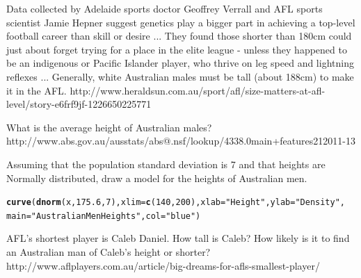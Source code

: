 \documentclass[bigtut]{tutorial}\usepackage[]{graphicx}\usepackage[]{color}
\makeatletter
\newcommand{\hlnum}[1]{\textcolor[rgb]{0.686,0.059,0.569}{#1}}%
\newcommand{\hlstr}[1]{\textcolor[rgb]{0.192,0.494,0.8}{#1}}%
\newcommand{\hlstd}[1]{\textcolor[rgb]{0.345,0.345,0.345}{#1}}%
\newcommand{\hlkwc}[1]{\textcolor[rgb]{0.333,0.667,0.333}{#1}}%
\newcommand{\hlkwd}[1]{\textcolor[rgb]{0.737,0.353,0.396}{\textbf{#1}}}%
\newenvironment{kframe}{%
 \def\at@end@of@kframe{}%
 \ifinner\ifhmode%
  \def\at@end@of@kframe{\end{minipage}}%
  \begin{minipage}{\columnwidth}%
 \fi\fi%
 \def\FrameCommand##1{\hskip\@totalleftmargin \hskip-\fboxsep
 \colorbox{shadecolor}{##1}\hskip-\fboxsep
     \hskip-\linewidth \hskip-\@totalleftmargin \hskip\columnwidth}%
 \MakeFramed {\advance\hsize-\width
   \@totalleftmargin\z@ \linewidth\hsize
   \@setminipage}}%
 {\par\unskip\endMakeFramed%
 \at@end@of@kframe}
\newenvironment{knitrout}{}{} %
\makeatother
\begin{document}
\begin{tutorial}
\begin{displaybox}
\end{displaybox}


\vspace{.5cm}
\begin{questions}

\question
Data collected by Adelaide sports doctor Geoffrey Verrall and AFL sports scientist Jamie Hepner suggest genetics play a bigger part in achieving a top-level football career than skill or desire ... They found those shorter than 180cm could just about forget trying for a place in the elite league - unless they happened to be an indigenous or Pacific Islander player, who thrive on leg speed and lightning reflexes ...
Generally, white Australian males must be tall (about 188cm) to
 make it in the AFL.
{\tiny http://www.heraldsun.com.au/sport/afl/size-matters-at-afl-level/story-e6frf9jf-1226650225771}

\vspace{.5cm}
\begin{parts}
\item What is the average height of Australian males? \\
{\tiny http://www.abs.gov.au/ausstats/abs@.nsf/lookup/4338.0main+features212011-13}

\vspace{.5cm}
\item  Assuming that the population standard deviation is 7 and that heights are Normally distributed, draw a model for the heights of Australian men.


\begin{knitrout}
\color{fgcolor}\begin{kframe}
\begin{alltt}
\hlkwd{curve}\hlstd{(}\hlkwd{dnorm}\hlstd{(x,}\hlnum{175.6}\hlstd{,}\hlnum{7}\hlstd{),}\hlkwc{xlim} \hlstd{=} \hlkwd{c}\hlstd{(}\hlnum{140}\hlstd{,} \hlnum{200}\hlstd{),} \hlkwc{xlab}\hlstd{=}\hlstr{"Height"}\hlstd{,} \hlkwc{ylab}\hlstd{=}\hlstr{"Density"}\hlstd{,}
      \hlkwc{main}\hlstd{=}\hlstr{"Australian Men Heights"}\hlstd{,}\hlkwc{col}\hlstd{=}\hlstr{"blue"}\hlstd{)}
\end{alltt}
\end{kframe}
\end{knitrout}

\vspace{.5cm}
\item  AFL's shortest player is Caleb Daniel. How tall is Caleb?  How likely is it to find an Australian man of Caleb's height or shorter?
{\tiny http://www.aflplayers.com.au/article/big-dreams-for-afls-smallest-player/}


\end{parts}
\end{questions}
\end{tutorial}
\end{document}
